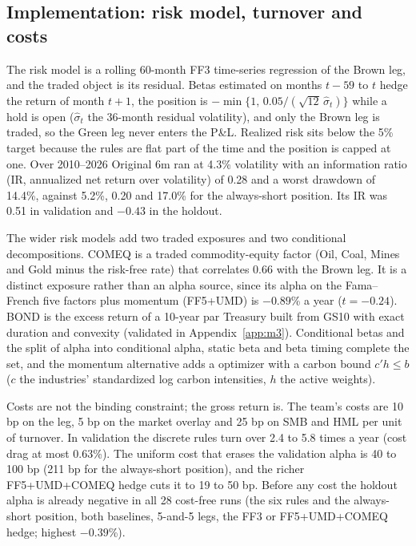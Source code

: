 \subsection{Implementation: risk model, turnover and costs}
\label{sec:implementation}

The risk model is a rolling 60-month FF3 time-series regression of the Brown leg, and the traded object is its residual. Betas estimated on months $t-59$ to $t$ hedge the return of month $t+1$, the position is $-\min\{1,\,0.05/(\sqrt{12}\,\hat\sigma_t)\}$ while a hold is open ($\hat\sigma_t$ the 36-month residual volatility), and only the Brown leg is traded, so the Green leg never enters the P\&L. Realized risk sits below the 5\% target because the rules are flat part of the time and the position is capped at one. Over 2010--2026 Original 6m ran at 4.3\% volatility with an information ratio (IR, annualized net return over volatility) of 0.28 and a worst drawdown of 14.4\%, against 5.2\%, 0.20 and 17.0\% for the always-short position. Its IR was 0.51 in validation and $-0.43$ in the holdout.

The wider risk models add two traded exposures and two conditional decompositions. COMEQ is a traded commodity-equity factor (Oil, Coal, Mines and Gold minus the risk-free rate) that correlates 0.66 with the Brown leg. It is a distinct exposure rather than an alpha source, since its alpha on the Fama--French five factors plus momentum (FF5+UMD) is $-0.89$\% a year ($t=-0.24$). BOND is the excess return of a 10-year par Treasury built from GS10 with exact duration and convexity (validated in Appendix~\ref{app:m3}). Conditional betas \citep{fs1996} and the \citet{ln2006} split of alpha into conditional alpha, static beta and beta timing complete the set, and the momentum alternative adds a \citet{gk2000} optimizer with a carbon bound $c'h\le b$ ($c$ the industries' standardized log carbon intensities, $h$ the active weights).

Costs are not the binding constraint; the gross return is. The team's costs are 10 bp on the leg, 5 bp on the market overlay and 25 bp on SMB and HML per unit of turnover. In validation the discrete rules turn over 2.4 to 5.8 times a year (cost drag at most 0.63\%). The uniform cost that erases the validation alpha is 40 to 100 bp (211 bp for the always-short position), and the richer FF5+UMD+COMEQ hedge cuts it to 19 to 50 bp. Before any cost the holdout alpha is already negative in all 28 cost-free runs (the six rules and the always-short position, both baselines, 5-and-5 legs, the FF3 or FF5+UMD+COMEQ hedge; highest $-0.39$\%).

